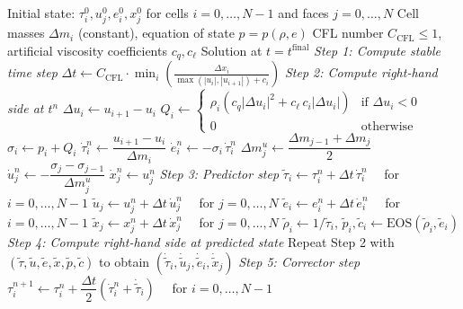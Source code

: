 \documentclass[12pt,a4paper]{article}
\begin{document}
\begin{algorithm}[H]
\caption{Compatible Lagrangian Hydrodynamics with Heun's Method}
\label{alg:timestepping}
\begin{algorithmic}[1]
\Require Initial state: $\tau_i^0, u_j^0, e_i^0, x_j^0$ for cells $i = 0, \ldots, N-1$ and faces $j = 0, \ldots, N$
\Require Cell masses $\Delta m_i$ (constant), equation of state $p = p(\rho, e)$
\Require CFL number $C_{\text{CFL}} \leq 1$, artificial viscosity coefficients $c_q, c_\ell$
\Ensure Solution at $t = t^{\text{final}}$
\State
{}
    \State
    \State \textit{Step 1: Compute stable time step}
    \State $\Delta t \gets C_{\text{CFL}} \cdot \displaystyle\min_{i} \left( \frac{\Delta x_i}{\max(|u_i|, |u_{i+1}|) + c_i} \right)$
    \State
    \State \textit{Step 2: Compute right-hand side at $t^n$}
        \State $\Delta u_i \gets u_{i+1} - u_i$
        \State $Q_i \gets \begin{cases} \rho_i \left( c_q |\Delta u_i|^2 + c_\ell \, c_i |\Delta u_i| \right) & \text{if } \Delta u_i < 0 \\ 0 & \text{otherwise} \end{cases}$
        \State $\sigma_i \gets p_i + Q_i$
        \State $\dot{\tau}_i^n \gets \dfrac{u_{i+1} - u_i}{\Delta m_i}$
        \State $\dot{e}_i^n \gets -\sigma_i \, \dot{\tau}_i^n$
    \EndFor
        \State $\Delta m_j^u \gets \dfrac{\Delta m_{j-1} + \Delta m_j}{2}$
        \State $\dot{u}_j^n \gets -\dfrac{\sigma_j - \sigma_{j-1}}{\Delta m_j^u}$
    \EndFor
        \State $\dot{x}_j^n \gets u_j^n$
    \EndFor
    \State
    \State \textit{Step 3: Predictor step}
    \State $\tilde{\tau}_i \gets \tau_i^n + \Delta t \, \dot{\tau}_i^n \quad$ for $i = 0, \ldots, N-1$
    \State $\tilde{u}_j \gets u_j^n + \Delta t \, \dot{u}_j^n \quad$ for $j = 0, \ldots, N$
    \State $\tilde{e}_i \gets e_i^n + \Delta t \, \dot{e}_i^n \quad$ for $i = 0, \ldots, N-1$
    \State $\tilde{x}_j \gets x_j^n + \Delta t \, \dot{x}_j^n \quad$ for $j = 0, \ldots, N$
    \State $\tilde{\rho}_i \gets 1/\tilde{\tau}_i$, \quad $\tilde{p}_i, \tilde{c}_i \gets \text{EOS}(\tilde{\rho}_i, \tilde{e}_i)$
    \State
    \State \textit{Step 4: Compute right-hand side at predicted state}
    \State Repeat Step 2 with $(\tilde{\tau}, \tilde{u}, \tilde{e}, \tilde{x}, \tilde{p}, \tilde{c})$ to obtain $(\dot{\tilde{\tau}}_i, \dot{\tilde{u}}_j, \dot{\tilde{e}}_i, \dot{\tilde{x}}_j)$
    \State
    \State \textit{Step 5: Corrector step}
    \State $\tau_i^{n+1} \gets \tau_i^n + \dfrac{\Delta t}{2} \left( \dot{\tau}_i^n + \dot{\tilde{\tau}}_i \right) \quad$ for $i = 0, \ldots, N-1$

\end{algorithmic}
\end{algorithm}
\end{document}
